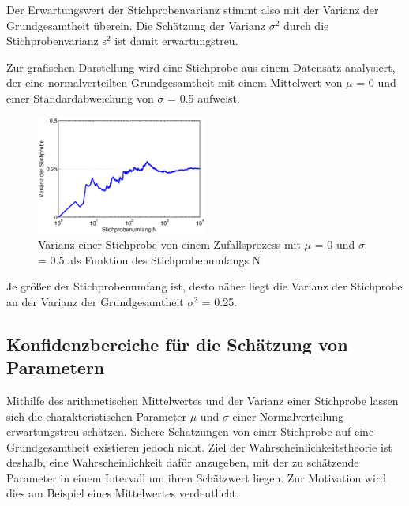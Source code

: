 \noindent Der Erwartungswert der Stichprobenvarianz stimmt also mit der Varianz der Grundgesamtheit \"{u}berein. Die Sch\"{a}tzung der Varianz $\sigma^{2}$ durch die Stichprobenvarianz s$^{2}$ ist damit erwartungstreu.\newline

\noindent Zur grafischen Darstellung wird eine Stichprobe aus einem Datensatz analysiert, der eine normalverteilten Grundgesamtheit mit einem Mittelwert von $\mu$ = 0 und einer Standardabweichung von $\sigma$ = 0.5 aufweist.

\noindent 
\begin{figure}[H]
  \centerline{\includegraphics[width=0.5\textwidth]{Kapitel5/Bilder/image5}}
  \caption{Varianz einer Stichprobe von einem Zufallsprozess mit $\mu$ = 0 und $\sigma$ = 0.5 als Funktion des Stichprobenumfangs N}
  \label{fig:StichprobeMittelwertStandardabweichungStichprobenumfang2}
\end{figure}

\noindent Je gr\"{o}{\ss}er der Stichprobenumfang ist, desto n\"{a}her liegt die Varianz der Stichprobe an der Varianz der Grundgesamtheit $\sigma^{2}$ = 0.25.

\clearpage

\subsection{Konfidenzbereiche f\"{u}r die Sch\"{a}tzung von Parametern}

\noindent Mithilfe des arithmetischen Mittelwertes und der Varianz einer Stichprobe lassen sich die charakteristischen Parameter $\mu$ und $\sigma$ einer Normalverteilung erwartungstreu sch\"{a}tzen. Sichere Sch\"{a}tzungen von einer Stichprobe auf eine Grundgesamtheit existieren jedoch nicht. Ziel der Wahrscheinlichkeitstheorie ist deshalb, eine Wahrscheinlichkeit daf\"{u}r anzugeben, mit der zu sch\"{a}tzende Parameter in einem Intervall um ihren Sch\"{a}tzwert liegen. Zur Motivation wird dies am Beispiel eines Mittelwertes verdeutlicht.\newline

